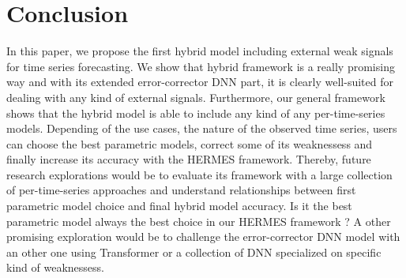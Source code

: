 \documentclass{article} %
\begin{document}




\section{Conclusion}
\label{sec:conclusion}

In this paper, we propose the first hybrid model including external weak signals for time series forecasting. We show that hybrid framework is a really promising way and with its extended error-corrector DNN part, it is clearly well-suited for dealing with any kind of external signals. Furthermore, our general framework shows that the hybrid model is able to include any kind of any per-time-series models. Depending of the use cases, the nature of the observed time series, users can choose the best parametric models, correct some of its weaknessess and finally increase its accuracy with the HERMES framework. Thereby, future research explorations would be to evaluate its framework with a large collection of per-time-series approaches and understand relationships between first parametric model choice and final hybrid model accuracy. Is it the best parametric model always the best choice in our HERMES framework ? A other promising exploration would be to challenge the error-corrector DNN model with an other one using Transformer or a collection of DNN specialized on specific kind of weaknessess.
\end{document}
